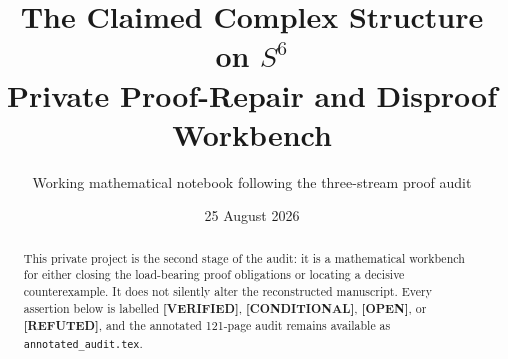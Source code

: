 \documentclass[11pt,letterpaper]{article}
\title{The Claimed Complex Structure on $S^6$\\
Private Proof-Repair and Disproof Workbench}
\author{Working mathematical notebook following the three-stream proof audit}
\date{25 August 2026}
\newcommand{\Status}[2]{\textcolor{#1}{\textbf{[#2]}}}
\newcommand{\Verified}{\Status{Verified}{VERIFIED}}
\newcommand{\Conditional}{\Status{Conditional}{CONDITIONAL}}
\newcommand{\Open}{\Status{Open}{OPEN}}
\newcommand{\Refuted}{\Status{Refuted}{REFUTED}}
\newcommand{\Source}[1]{\textcolor{Provenance}{\nolinkurl{#1}}}
\theoremstyle{definition}
\theoremstyle{remark}
\begin{document}
\maketitle

\begin{abstract}
This private project is the second stage of the audit: it is a mathematical workbench for either closing the load-bearing proof obligations or locating a decisive counterexample. It does not silently alter the reconstructed manuscript. Every assertion below is labelled \Verified, \Conditional, \Open, or \Refuted, and the annotated 121-page audit remains available as \Source{annotated_audit.tex}.
\end{abstract}

\tableofcontents









\end{document}
